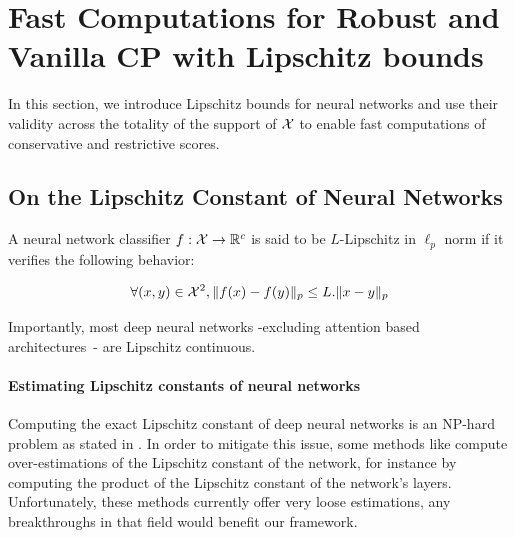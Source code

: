 

\section{Fast Computations for Robust and Vanilla CP with Lipschitz bounds}
\label{sec:efficient_robust_sets}

In this section, we introduce Lipschitz bounds for neural networks and use their validity across the totality of the support of $\mathcal{X}$ to enable fast computations of conservative and restrictive scores. 

\subsection{On the Lipschitz Constant of Neural Networks}
%
\begin{definition}
    A neural network classifier $f: \mathcal{X} \rightarrow \mathbb{R}^{c}$ is said to be $L$-Lipschitz in $\ell_p$ norm if it verifies the following behavior:

    \begin{equation}
        \forall(x,y) \in \mathcal{X}^2, \| f(x) - f(y) \|_p \leq L.\| x - y \|_p
    \end{equation}
\end{definition}

Importantly, most deep neural networks -excluding attention based architectures~\cite{havensfine}- are Lipschitz continuous.

\paragraph{Estimating Lipschitz constants of neural networks} Computing the exact Lipschitz constant of deep neural networks is an NP-hard problem as stated in \cite{lipschitznphard}. In order to mitigate this issue, some methods like \cite{wang2024on} compute over-estimations of the Lipschitz constant of the network, for instance by computing the product of the Lipschitz constant of the network's layers. Unfortunately, these methods currently offer very loose estimations, any breakthroughs in that field would benefit our framework.


